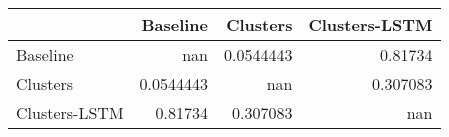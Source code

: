 \begin{tabular}{lrrr}
\toprule
               &    Baseline &    Clusters &   Clusters-LSTM \\
\midrule
 Baseline      & nan         &   0.0544443 &        0.81734  \\
 Clusters      &   0.0544443 & nan         &        0.307083 \\
 Clusters-LSTM &   0.81734   &   0.307083  &      nan        \\
\bottomrule
\end{tabular}